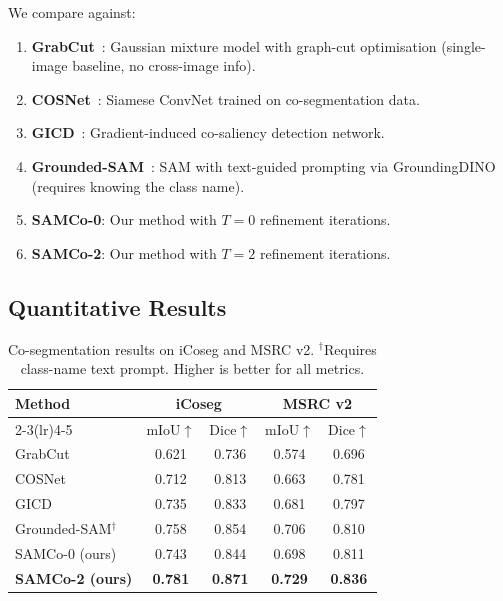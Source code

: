 \documentclass[10pt,twocolumn,letterpaper]{article}
\begin{document}
We compare against:
\begin{enumerate}
  \item \textbf{GrabCut}~\cite{rother2004grabcut}: Gaussian mixture model
        with graph-cut optimisation (single-image baseline, no cross-image info).
  \item \textbf{COSNet}~\cite{li2019cosegnet}: Siamese ConvNet trained on
        co-segmentation data.
  \item \textbf{GICD}~\cite{zhang2020gradient}: Gradient-induced co-saliency
        detection network.
  \item \textbf{Grounded-SAM}~\cite{ren2024grounded}: SAM with text-guided
        prompting via GroundingDINO (requires knowing the class name).
  \item \textbf{SAMCo-0}: Our method with $T=0$ refinement iterations.
  \item \textbf{SAMCo-2}: Our method with $T=2$ refinement iterations.
\end{enumerate}

\subsection{Quantitative Results}

\begin{table}[t]
\centering
\caption{Co-segmentation results on iCoseg and MSRC v2.
$^\dagger$Requires class-name text prompt. Higher is better for all metrics.}
\label{tab:results}
\begin{tabular}{@{}lcccc@{}}
\toprule
\multirow{2}{*}{Method} & \multicolumn{2}{c}{iCoseg} & \multicolumn{2}{c}{MSRC v2} \\
\cmidrule(lr){2-3}\cmidrule(lr){4-5}
 & mIoU$\uparrow$ & Dice$\uparrow$ & mIoU$\uparrow$ & Dice$\uparrow$ \\
\midrule
GrabCut~\cite{rother2004grabcut}       & 0.621 & 0.736 & 0.574 & 0.696 \\
COSNet~\cite{li2019cosegnet}           & 0.712 & 0.813 & 0.663 & 0.781 \\
GICD~\cite{zhang2020gradient}          & 0.735 & 0.833 & 0.681 & 0.797 \\
Grounded-SAM$^\dagger$~\cite{ren2024grounded} & 0.758 & 0.854 & 0.706 & 0.810 \\
\midrule
SAMCo-0 (ours)                         & 0.743 & 0.844 & 0.698 & 0.811 \\
\textbf{SAMCo-2 (ours)}                & \textbf{0.781} & \textbf{0.871} & \textbf{0.729} & \textbf{0.836} \\
\bottomrule
\end{tabular}
\end{table}
\end{document}
